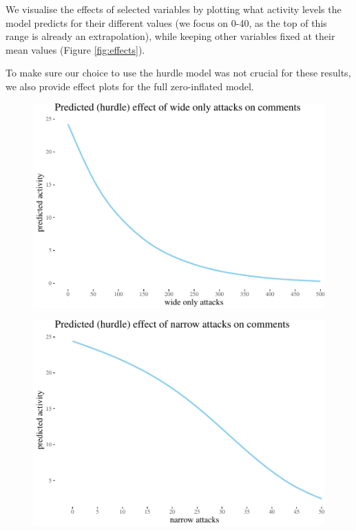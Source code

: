 \documentclass[10pt,dvipsnames]{scrartcl}
\begin{document}
We visualise the effects of selected variables by plotting what activity
levels the model predicts for their different values (we focus on 0-40,
as the top of this range is already an extrapolation), while keeping
other variables fixed at their mean values (Figure \ref{fig:effects}).

\footnotesize

\normalsize

To make sure our choice to use the hurdle model was not crucial for
these results, we also provide effect plots for the full zero-inflated
model.

\begin{figure}
\centering


\begin{center}\includegraphics[width=0.85\linewidth]{quittingShortAbridgedRevisions2_files/figure-latex/unnamed-chunk-47-1} \end{center}
\end{figure}

\begin{figure}

\begin{center}\includegraphics[width=0.85\linewidth]{quittingShortAbridgedRevisions2_files/figure-latex/unnamed-chunk-48-1} \end{center}
\end{figure}
\end{document}
